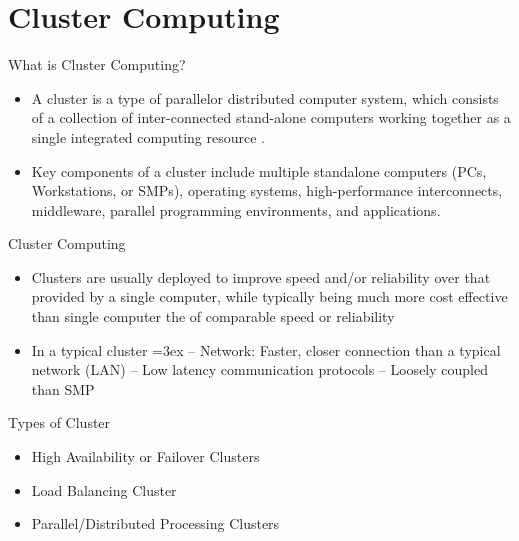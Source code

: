 \documentclass{SKP-beamer}
\begin{document}
\section{\textbf{Cluster Computing}}



\begin{frame}{What is Cluster Computing?}
	\begin{itemize}
		
		\item   A cluster is a type of parallelor distributed
		computer system, which consists of a
		collection of inter-connected stand-alone computers 
		working together as a single integrated
		computing resource .
		\item Key components of a cluster include multiple 
		standalone computers (PCs, Workstations, or SMPs), 
		operating systems, high-performance interconnects, 
		middleware, parallel programming environments, and
		applications.
		
	\end{itemize}
\end{frame}

\begin{frame}{ Cluster Computing}
	\begin{itemize}
		
		\item   Clusters are usually deployed to improve speed and/or reliability 
		over that provided by a single computer, while typically being 
		much more cost effective than single computer the of comparable 
		speed or reliability
		\item In a typical cluster \itemsep=3ex
		– Network: Faster, closer connection than a typical 
		network (LAN)
		– Low latency communication protocols
		– Loosely coupled than SMP
	\end{itemize}
\end{frame}


\begin{frame}{Types of Cluster}
	\begin{itemize}
		
		\item High Availability or Failover Clusters
		\item Load Balancing Cluster
		\item Parallel/Distributed Processing 
		Clusters
		
		
	\end{itemize}
\end{frame}
\end{document}
